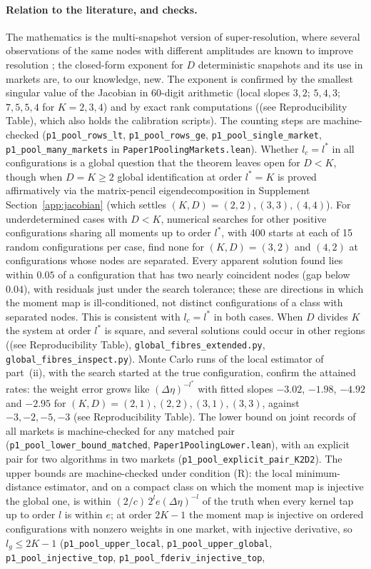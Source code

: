 \paragraph{Relation to the literature, and checks.} The mathematics is the multi-snapshot version of super-resolution, where several observations of the same nodes with different amplitudes are known to improve resolution \citep{li2022}; the closed-form exponent for $D$ deterministic snapshots and its use in markets are, to our knowledge, new. The exponent is confirmed by the smallest singular value of the Jacobian in 60-digit arithmetic (local slopes $3,2$; $5,4,3$; $7,5,5,4$ for $K=2,3,4$) and by exact rank computations ((see Reproducibility Table), which also holds the calibration scripts). The counting steps are machine-checked (\texttt{p1\_pool\_rows\_lt}, \texttt{p1\_pool\_rows\_ge}, \texttt{p1\_pool\_single\_market}, \texttt{p1\_pool\_many\_markets} in \nolinkurl{Paper1PoolingMarkets.lean}). Whether $l_c=l^*$ in all configurations is a global question that the theorem leaves open for $D < K$, though when $D=K\ge2$ global identification at order $l^*=K$ is proved affirmatively via the matrix-pencil eigendecomposition in Supplement Section~\ref{app:jacobian} (which settles $(K,D)=(2,2), (3,3), (4,4)$). For underdetermined cases with $D < K$, numerical searches for other positive configurations sharing all moments up to order $l^*$, with 400 starts at each of 15 random configurations per case, find none for $(K,D)=(3,2)$ and $(4,2)$ at configurations whose nodes are separated. Every apparent solution found lies within $0.05$ of a configuration that has two nearly coincident nodes (gap below $0.04$), with residuals just under the search tolerance; these are directions in which the moment map is ill-conditioned, not distinct configurations of a class with separated nodes. This is consistent with $l_c=l^*$ in both cases. When $D$ divides $K$ the system at order $l^*$ is square, and several solutions could occur in other regions ((see Reproducibility Table), \nolinkurl{global_fibres_extended.py}, \nolinkurl{global_fibres_inspect.py}). Monte Carlo runs of the local estimator of part~(ii), with the search started at the true configuration, confirm the attained rates: the weight error grows like $(\Delta\eta)^{-l^*}$ with fitted slopes $-3.02$, $-1.98$, $-4.92$ and $-2.95$ for $(K,D)=(2,1),(2,2),(3,1),(3,3)$, against $-3,-2,-5,-3$ (see Reproducibility Table). The lower bound on joint records of all markets is machine-checked for any matched pair (\texttt{p1\_pool\_lower\_bound\_matched}, \nolinkurl{Paper1PoolingLower.lean}), with an explicit pair for two algorithms in two markets (\texttt{p1\_pool\_explicit\_pair\_K2D2}). The upper bounds are machine-checked under condition (R): the local minimum-distance estimator, and on a compact class on which the moment map is injective the global one, is within $(2/c)\,2^l e(\Delta\eta)^{-l}$ of the truth when every kernel tap up to order $l$ is within $e$; at order $2K-1$ the moment map is injective on ordered configurations with nonzero weights in one market, with injective derivative, so $l_g\le2K-1$ (\texttt{p1\_pool\_upper\_local}, \texttt{p1\_pool\_upper\_global}, \texttt{p1\_pool\_injective\_top}, \texttt{p1\_pool\_fderiv\_injective\_top}, 